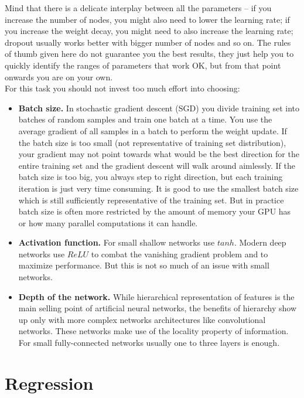 \documentclass[a4paper,11pt]{article}
\begin{document}
Mind that there is a delicate interplay between all the parameters -- if you increase the number of nodes, you might also need to lower the learning rate; if you increase the weight decay, you might need to also increase the learning rate; dropout usually works better with bigger number of nodes and so on. The rules of thumb given here do not guarantee you the best results, they just help you to quickly identify the ranges of parameters that work OK, but from that point onwards you are on your own.\\

For this task you should not invest too much effort into choosing:

\begin{itemize}
	\item \textbf{Batch size.} In stochastic gradient descent (SGD) you divide training set into batches of random samples and train one batch at a time. You use the average gradient of all samples in a batch to perform the weight update. If the batch size is too small (not representative of training set distribution), your gradient may not point towards what would be the best direction for the entire training set and the gradient descent will walk around aimlessly. If the batch size is too big, you always step to right direction, but each training iteration is just very time consuming. It is good to use the smallest batch size which is still sufficiently representative of the training set. But in practice batch size is often more restricted by the amount of memory your GPU has or how many parallel computations it can handle.
	\item \textbf{Activation function.} For small shallow networks use $tanh$. Modern deep networks use $ReLU$ to combat the vanishing gradient problem and to maximize performance. But this is not so much of an issue with small networks.
	\item \textbf{Depth of the network.} While hierarchical representation of features is the main selling point of artificial neural networks, the benefits of hierarchy show up only with more complex networks architectures like convolutional networks. These networks make use of the locality property of information. For small fully-connected networks usually one to three layers is enough.
 \end{itemize}

%
%
\section{Regression}
\end{document}
